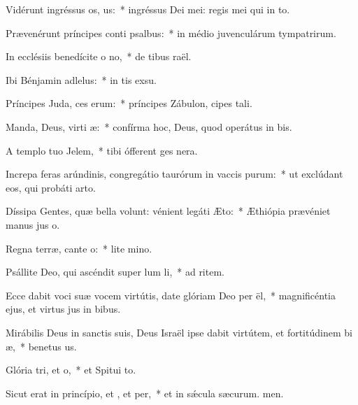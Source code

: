 \item Vidérunt ingréssus os, us:~* ingréssus Dei mei: regis mei qui  in to.
\item Prævenérunt príncipes conti psalbus:~* in médio juvenculárum tympatrirum.
\item In ecclésiis benedícite o no,~* de tibus raël.
\item Ibi Bénjamin adlelus:~* in tis exsu.
\item Príncipes Juda, ces erum:~* príncipes Zábulon, cipes tali.
\item Manda, Deus, virti æ:~* confírma hoc, Deus, quod operátus  in bis.
\item A templo tuo  Jelem,~* tibi ófferent ges nera.
\item Increpa feras arúndinis, congregátio taurórum in vaccis purum:~* ut exclúdant eos, qui probáti  arto.
\item Díssipa Gentes, quæ bella volunt: vénient legáti  Æto:~* Æthiópia prævéniet manus jus o.
\item Regna terræ, cante o:~* lite mino.
\item Psállite Deo, qui ascéndit super lum li,~* ad ritem.
\item Ecce dabit voci suæ vocem virtútis, date glóriam Deo per ël,~* magnificéntia ejus, et virtus jus in bibus.
\item Mirábilis Deus in sanctis suis, Deus Israël ipse dabit virtútem, et fortitúdinem bi æ,~* benetus us.
\item Glória tri, et o,~* et Spitui to.
\item Sicut erat in princípio, et , et per,~* et in sǽcula sæcurum. men.
